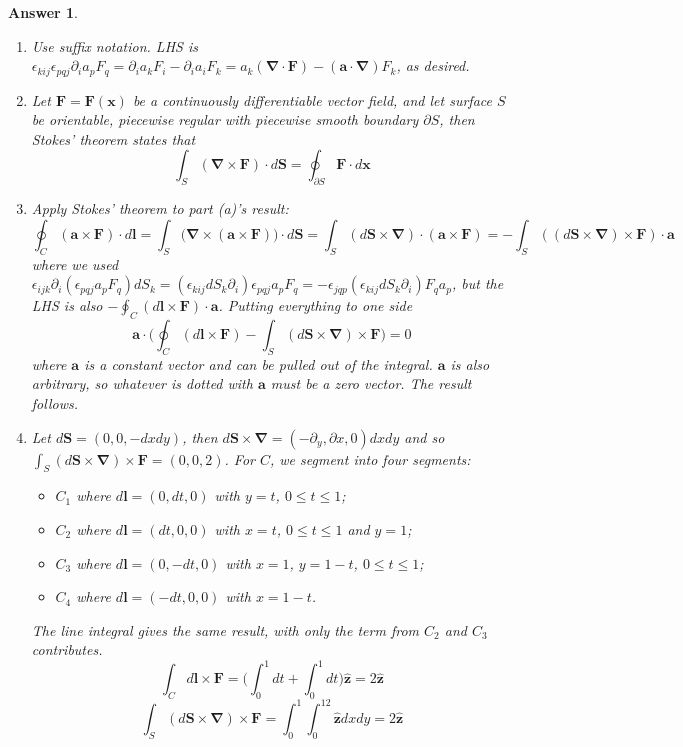 \documentclass[a4paper]{article}
\newtheorem{ans}{Answer}[section]
\theoremstyle{new}
\begin{document}
\begin{ans}\leavevmode
\begin{enumerate}[label=(\alph*)]
    \item Use suffix notation. LHS is $\epsilon_{kij}\epsilon_{pqj}\partial_ia_pF_q=\partial_ia_kF_i-\partial_ia_iF_k=a_k(\boldsymbol{\nabla}\cdot\mathbf{F})-(\mathbf{a}\cdot\boldsymbol{\nabla})F_k$, as desired.
    \item Let $\mathbf{F}=\mathbf{F}(\mathbf{x})$ be a continuously differentiable vector field, and let surface $S$ be orientable, piecewise regular with piecewise smooth boundary $\partial S$, then Stokes' theorem states that
$$\int_S(\boldsymbol{\nabla}\times\mathbf{F})\cdot d\mathbf{S}=\oint_{\partial S}\mathbf{F}\cdot d\mathbf{x}$$
    \item Apply Stokes' theorem to part (a)'s result:
$$\oint_C(\mathbf{a}\times\mathbf{F})\cdot d\mathbf{l}=\int_S\bigg(\boldsymbol{\nabla}\times(\mathbf{a}\times\mathbf{F})\bigg)\cdot d\mathbf{S}=\int_S(d\mathbf{S}\times\boldsymbol{\nabla})\cdot(\mathbf{a}\times\mathbf{F})=-\int_S((d\mathbf{S}\times\boldsymbol{\nabla})\times\mathbf{F})\cdot \mathbf{a}$$
where we used $\epsilon_{ijk}\partial_i(\epsilon_{pqj}a_pF_q)dS_k=(\epsilon_{kij}dS_k\partial_i)\epsilon_{pqj}a_pF_q= -\epsilon_{jqp}(\epsilon_{kij}dS_k\partial_i)F_qa_p$, but the LHS is also $-\oint_C( d\mathbf{l}\times\mathbf{F})\cdot\mathbf{a}$. Putting everything to one side
$$\mathbf{a}\cdot\bigg(\oint_C(d\mathbf{l}\times\mathbf{F})-\int_S(d\mathbf{S}\times\boldsymbol{\nabla})\times\mathbf{F}\bigg)=0$$
where $\mathbf{a}$ is a constant vector and can be pulled out of the integral. $\mathbf{a}$ is also arbitrary, so whatever is dotted with $\mathbf{a}$ must be a zero vector. The result follows.
\item Let $d\mathbf{S}=(0,0,-dxdy)$, then $d\mathbf{S}\times\boldsymbol{\nabla}=(-\partial_y,\partial x,0)dxdy$ and so $\int_S(d\mathbf{S}\times\boldsymbol{\nabla})\times\mathbf{F}=(0,0,2)$. For $C$, we segment into four segments: 
\begin{itemize}
    \item $C_1$ where $d\mathbf{l}=(0,dt,0)$ with $y=t$, $0\leq t\leq 1$;
    \item $C_2$ where $d\mathbf{l}=(dt,0,0)$ with $x=t$, $0\leq t\leq 1$ and $y=1$;
    \item $C_3$ where $d\mathbf{l}=(0,-dt,0)$ with $x=1$, $y=1-t$, $0\leq t\leq 1$;
    \item $C_4$ where $d\mathbf{l}=(-dt,0,0)$ with $x=1-t$.
\end{itemize}
The line integral gives the same result, with only the term from $C_2$ and $C_3$ contributes.
$$\int_Cd\mathbf{l}\times\mathbf{F}=\bigg(\int_0^1dt+\int_0^1dt\bigg)\mathbf{\hat{z}}=2\mathbf{\hat{z}}$$
$$\int_S(d\mathbf{S}\times\boldsymbol{\nabla})\times\mathbf{F}=\int_0^1\int_0^12\mathbf{\hat{z}}dxdy=2\mathbf{\hat{z}}$$
\end{enumerate}
\end{ans}
\end{document}
